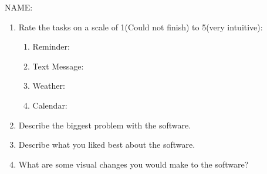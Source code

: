\documentclass{article}
\begin{document}
\rhead{}

{\large NAME:}
\vspace{1cm}
\begin{enumerate}
    \item Rate the tasks on a scale of 1(Could not finish) to 5(very intuitive):
        \begin{enumerate}
                \setlength{\itemsep}{1cm}
            \item Reminder:
            \item Text Message:
            \item Weather:
            \item Calendar:
        \end{enumerate}
    \item Describe the biggest problem with the software.
        \setlength{\itemsep}{4cm}
    \item Describe what you liked best about the software.
    \item What are some visual changes you would make to the software?
\end{enumerate}
\end{document}
